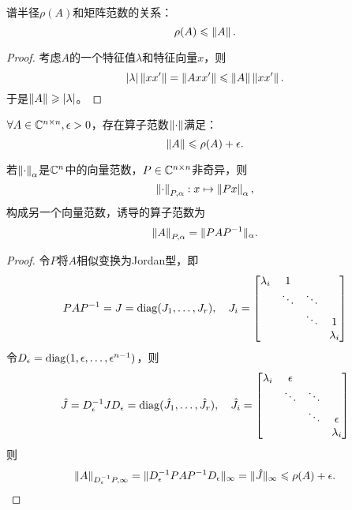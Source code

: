 \begin{theorem}
    {}{}
    谱半径$\rho(A)$和矩阵范数的关系：
    \begin{equation}
        \rho(A)\leqslant\left\lVert A\right\rVert.
    \end{equation}
\end{theorem}

\begin{proof}
    考虑$A$的一个特征值$\lambda$和特征向量$x$，则 
    \[
        \left\lvert\lambda\right\rvert\left\lVert xx'\right\rVert=\left\lVert Axx'\right\rVert\leqslant\left\lVert A\right\rVert\left\lVert xx'\right\rVert.
    \]
    于是$\left\lVert A\right\rVert\geqslant\left\lvert\lambda\right\rvert$。
\end{proof}

\begin{theorem}
    {}{}
    $\forall A\in\mathbb C^{n\times n},\epsilon>0$，存在算子范数$\left\lVert\cdot\right\rVert$满足：
    \begin{equation}
        \left\lVert A\right\rVert\leqslant\rho(A)+\epsilon.
    \end{equation}
\end{theorem}

\begin{lemma}
    若$\left\lVert\cdot\right\rVert_\alpha$是$\mathbb C^n$中的向量范数，$P\in\mathbb C^{n\times n}$非奇异，则
    \[
        \left\lVert\cdot\right\rVert_{P,\alpha}:x\mapsto\left\lVert Px\right\rVert_\alpha,
    \]
    构成另一个向量范数，诱导的算子范数为
    \[
        \left\lVert A\right\rVert_{P,\alpha}=\lVert PAP^{-1}\rVert_\alpha.
    \]
\end{lemma}

\begin{proof}
    令$P$将$A$相似变换为Jordan型，即
    \[
        PAP^{-1}=J=\operatorname{diag}(J_1,\ldots,J_r),\quad J_i=\begin{bmatrix}
            \lambda_i&1\\
            &\ddots&\ddots\\
            &&\ddots&1\\
            &&&\lambda_i
        \end{bmatrix}
    \]
    令$D_\epsilon=\operatorname{diag}(1,\epsilon,\ldots,\epsilon^{n-1})$，则 
    \[
        \hat J=D_\epsilon^{-1} JD_\epsilon=\operatorname{diag}(\hat J_1,\ldots,\hat J_r),\quad\hat J_i=\begin{bmatrix}
            \lambda_i&\epsilon\\
            &\ddots&\ddots\\
            &&\ddots&\epsilon\\
            &&&\lambda_i
        \end{bmatrix}
    \]
    则
    \[
        \left\lVert A\right\rVert_{D_\epsilon^{-1} P,\infty}=\lVert D_\epsilon^{-1} PAP^{-1} D_\epsilon\rVert_\infty=\lVert\hat J\rVert_\infty\leqslant\rho(A)+\epsilon.
        \qedhere
    \]
\end{proof}

